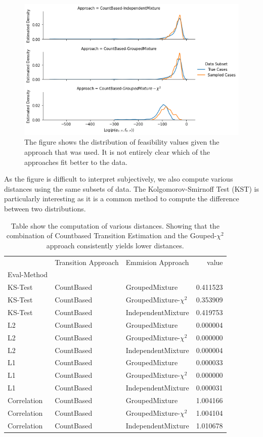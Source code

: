 \documentclass[./../../paper.tex]{subfiles}
\begin{document}
\begin{figure}
    \centering
    \includegraphics[width=\textwidth]{figures/results/result_distributions.png}
    \caption{The figure shows the distribution of feasibility values given the approach that was used. It is not entirely clear which of the approaches fit better to the data.}
    \label{fig:distributions}
\end{figure}

As the figure is difficult to interpret subjectively, we also compute various distances using the same subsets of data. The Kolgomorov-Smirnoff Test (KST) is particularly interesting as it is a common method to compute the difference between two distributions.

\begin{table}
    \caption{Table show the computation of various distances. Showing that the combination of Countbased Transition Estimation and the Gouped-$\chi^2$ approach consistently yields lower distances.}
    \label{tbl:distributions}
    \begin{tabular}{lllr}
     & Transition Approach & Emmision Approach & value \\
    Eval-Method &  &  &  \\
    KS-Test & CountBased & GroupedMixture & 0.411523 \\
    KS-Test & CountBased & GroupedMixture-$\chi^2$ & 0.353909 \\
    KS-Test & CountBased & IndependentMixture & 0.419753 \\
    L2 & CountBased & GroupedMixture & 0.000004 \\
    L2 & CountBased & GroupedMixture-$\chi^2$ & 0.000000 \\
    L2 & CountBased & IndependentMixture & 0.000004 \\
    L1 & CountBased & GroupedMixture & 0.000033 \\
    L1 & CountBased & GroupedMixture-$\chi^2$ & 0.000000 \\
    L1 & CountBased & IndependentMixture & 0.000031 \\
    Correlation & CountBased & GroupedMixture & 1.004166 \\
    Correlation & CountBased & GroupedMixture-$\chi^2$ & 1.004104 \\
    Correlation & CountBased & IndependentMixture & 1.010678 \\
    \end{tabular}
\end{table}
\end{document}
